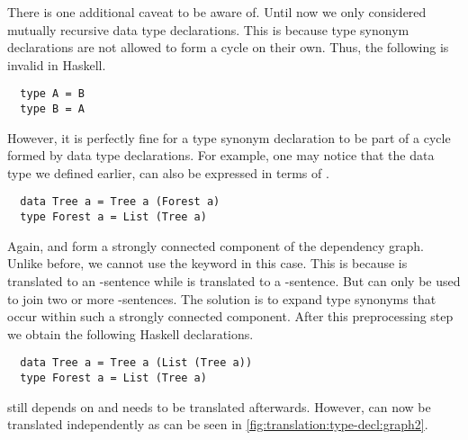 There is one additional caveat to be aware of.
Until now we only considered mutually recursive data type declarations.
This is because type synonym declarations are not allowed to form a cycle on their own.
Thus, the following is invalid in Haskell.
\begin{verbatim}
  type A = B
  type B = A
\end{verbatim}
However, it is perfectly fine for a type synonym declaration to be part of a cycle formed by data type declarations.
For example, one may notice that the  data type we defined earlier, can also be expressed in terms of .
\begin{verbatim}
  data Tree a = Tree a (Forest a)
  type Forest a = List (Tree a)
\end{verbatim}
Again,  and  form a strongly connected component of the dependency graph.
Unlike before, we cannot use the  keyword in this case.
This is because  is translated to an -sentence while  is translated to a -sentence.
But  can only be used to join two or more -sentences.
The solution is to expand type synonyms that occur within such a strongly connected component.
After this preprocessing step we obtain the following Haskell declarations.
\begin{verbatim}
  data Tree a = Tree a (List (Tree a))
  type Forest a = List (Tree a)
\end{verbatim}
 still depends on  and needs to be translated afterwards.
However,  can now be translated independently as can be seen in \autoref{fig:translation:type-decl:graph2}.

